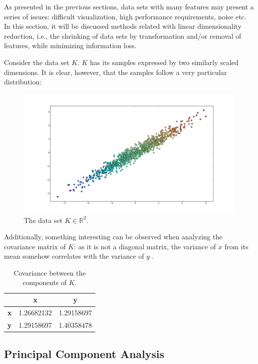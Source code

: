 \documentclass[12pt]{article}
\begin{document}
As presented in the previous sections, data sets with many features may present a series of issues: difficult visualization, high performance requirements, noise etc. In this section, it will be discussed methods related with linear dimensionality reduction, i.e., the shrinking of data sets by transformation and/or removal of features, while minimizing information loss.

Consider the data set $K$. $K$ has its samples expressed by two similarly scaled dimensions. It is clear, however, that the samples follow a very particular distribution:

\begin{figure}[H]
    \centering
	\captionsetup{justification=centering}

	\includegraphics[width=.8\linewidth]{datasetr}
	\caption{The data set $K \in \mathbb{R}^2$.}
	\label{fig:datasetr}
\end{figure}

Additionally, something interesting can be observed when analyzing the covariance matrix of $K$: as it is not a diagonal matrix, the variance of $x$ from its mean somehow correlates with the variance of $y$ \cite{pcajon2003}.

\begin{table}[H]
	\centering
	\begin{tabular}{|c|c|c|}
		\hline
			& \textbf{x} & \textbf{y} \\\hline
		\textbf{x} & 1.26682132  & 1.29158697 \\\hline
		\textbf{y} & 1.29158697  & 1.40358478 \\\hline
	\end{tabular}
	\caption{Covariance between the components of $K$.}
\end{table}

\subsection{Principal Component Analysis}
\end{document}
